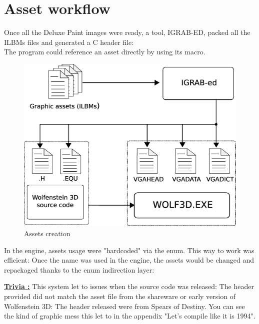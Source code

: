 \documentclass[book.tex]{subfiles}
\begin{document}
\section{Asset workflow}
Once all the Deluxe Paint images were ready, a tool, IGRAB-ED, packed all the ILBMs files and generated a C header file:\\
 The program could reference an asset directly by using its macro.\\
\begin{figure}[H]
\centering
 \includegraphics[width=\textwidth]{imgs/drawing_plain.eps}
 \caption{Assets creation} \label{fig:mips}
 \end{figure}

\begin{minipage}{\textwidth}
 \par
 \end{minipage}
 
 In the engine, assets usage were "hardcoded" via the enum. This way to work was efficient: Once the name was used in the engine, the assets would be changed and repackaged thanks to the enum indirection layer:
 
 \begin{minipage}{\textwidth}
 \par
 \end{minipage}

\textbf{\underline{Trivia :}} This system let to issues when the source code was released: The header provided did not match the asset file from the shareware or early version of Wolfenstein 3D: The header released were from Spears of Destiny. You can see the kind of graphic mess this let to in the appendix "Let's compile like it is 1994".\\
\end{document}
